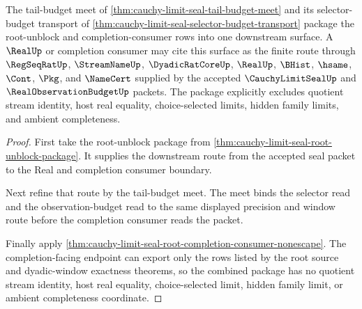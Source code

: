 \begin{theorem}
\label{thm:cauchy-limit-seal-completion-budget-root-unblock}
The tail-budget meet of \autoref{thm:cauchy-limit-seal-tail-budget-meet} and its selector-budget transport of \autoref{thm:cauchy-limit-seal-selector-budget-transport} package the root-unblock and completion-consumer rows into one downstream surface. A $\RealUp$ or completion consumer may cite this surface as the finite route through $\RegSeqRatUp$, $\StreamNameUp$, $\DyadicRatCoreUp$, $\RealUp$, $\BHist$, $\hsame$, $\Cont$, $\Pkg$, and $\NameCert$ supplied by the accepted $\CauchyLimitSealUp$ and $\RealObservationBudgetUp$ packets. The package explicitly excludes quotient stream identity, host real equality, choice-selected limits, hidden family limits, and ambient completeness.
\end{theorem}
\begin{proof}
First take the root-unblock package from \autoref{thm:cauchy-limit-seal-root-unblock-package}. It supplies the downstream route from the accepted seal packet to the Real and completion consumer boundary.

Next refine that route by the tail-budget meet. The meet binds the selector read and the observation-budget read to the same displayed precision and window route before the completion consumer reads the packet.

Finally apply \autoref{thm:cauchy-limit-seal-root-completion-consumer-nonescape}. The completion-facing endpoint can export only the rows listed by the root source and dyadic-window exactness theorems, so the combined package has no quotient stream identity, host real equality, choice-selected limit, hidden family limit, or ambient completeness coordinate.
\end{proof}

